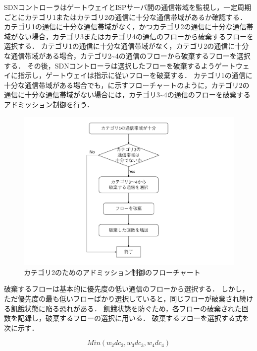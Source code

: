 \documentclass[a4paper,11pt,uplatex]{ujreport}
\begin{document}
  SDNコントローラはゲートウェイとISPサーバ間の通信帯域を監視し，一定周期ごとにカテゴリ1またはカテゴリ2の通信に十分な通信帯域があるか確認する．
  カテゴリ1の通信に十分な通信帯域がなく，かつカテゴリ2の通信に十分な通信帯域がない場合，カテゴリ3またはカテゴリ4の通信のフローから破棄するフローを選択する．
  カテゴリ1の通信に十分な通信帯域がなく，カテゴリ2の通信に十分な通信帯域がある場合，カテゴリ2\textasciitilde4の通信のフローから破棄するフローを選択する．
  その後，SDNコントローラは選択したフローを破棄するようゲートウェイに指示し，ゲートウェイは指示に従いフローを破棄する．
  カテゴリ1の通信に十分な通信帯域がある場合でも，に示すフローチャートのように，カテゴリ2の通信に十分な通信帯域がない場合には，カテゴリ3\textasciitilde4の通信のフローを破棄するアドミッション制御を行う．\par

  \begin{figure}[!tb]
    \centering
    \includegraphics[width=\linewidth]{img/adomission_c2.pdf}
    \caption{カテゴリ2のためのアドミッション制御のフローチャート}
    \label{fig:adomission2}
  \end{figure}

  破棄するフローは基本的に優先度の低い通信のフローから選択する．
  しかし，ただ優先度の最も低いフローばかり選択していると，同じフローが破棄され続ける飢餓状態に陥る恐れがある．
  飢餓状態を防ぐため，各フローの破棄された回数を記録し，破棄するフローの選択に用いる．
  破棄するフローを選択する式を次に示す．\par

  \begin{equation}
    Min(w_2 dc_2, w_3 dc_3, w_4 dc_4)
  \end{equation}
\end{document}
